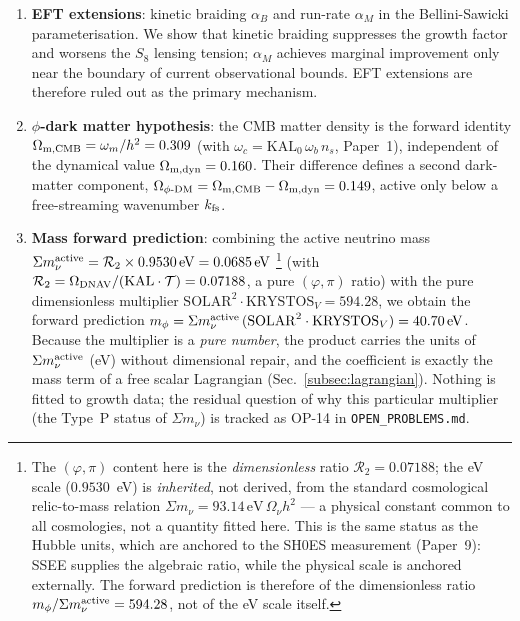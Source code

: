 \documentclass[12pt,a4paper]{article}
\newcommand{\phiDM}{\phi\text{-DM}}
\newcommand{\kfs}{k_{\rm fs}}
\newcommand{\mphi}{m_\phi}
\newcommand{\mnu}{\Sigma m_\nu}
\begin{document}
\begin{enumerate}
  \item \textbf{EFT extensions}: kinetic braiding $\alpha_B$ and run-rate $\alpha_M$
    in the Bellini-Sawicki \citep{Bellini2015} parameterisation.
    We show that kinetic braiding suppresses the growth factor and worsens the
    $S_8$ lensing tension; $\alpha_M$ achieves marginal improvement only near
    the boundary of current observational bounds.  EFT extensions are therefore
    ruled out as the primary mechanism.
  \item \textbf{$\phi$-dark matter hypothesis}: the CMB matter density is the
    forward identity $\Omega_{\rm m,CMB} = \omega_m/h^2 = 0.309$
    (with $\omega_c = \mathrm{KAL}_0\,\omega_b\,n_s$, Paper~1), independent of the
    dynamical value $\Omega_{\rm m,dyn} = 0.160$. Their difference defines a second
    dark-matter component, $\Omega_{\phiDM} = \Omega_{\rm m,CMB} - \Omega_{\rm m,dyn}
    = 0.149$, active only below a free-streaming wavenumber $\kfs$.
  \item \textbf{Mass forward prediction}: combining the active neutrino mass
    $\mnu^{\rm active} = \mathcal{R}_2 \times 0.9530\,\mathrm{eV} = 0.0685\,\mathrm{eV}$%
    \footnote{The $(\varphi,\pi)$ content here is the \emph{dimensionless} ratio
    $\mathcal{R}_2 = 0.07188$; the eV scale ($0.9530$~eV) is \emph{inherited}, not derived,
    from the standard cosmological relic-to-mass relation
    $\Sigma m_\nu = 93.14\,\mathrm{eV}\,\Omega_\nu h^2$ --- a physical constant common to
    all cosmologies, not a quantity fitted here. This is the same status as the Hubble
    units, which are anchored to the SH0ES measurement (Paper~9): SSEE supplies the
    algebraic ratio, while the physical scale is anchored externally. The forward
    prediction is therefore of the dimensionless ratio $\mphi/\mnu^{\rm active}=594.28$,
    not of the eV scale itself.}
    (with $\mathcal{R}_2 = \Omega_{\rm DNAV}/(\mathrm{KAL}\cdot\mathcal{T}) = 0.07188$,
    a pure $(\varphi,\pi)$ ratio) with the pure dimensionless multiplier
    $\mathrm{SOLAR}^2\cdot\mathrm{KRYSTOS}_V = 594.28$, we obtain the
    forward prediction
    $\mphi = \mnu^{\rm active}\,(\mathrm{SOLAR}^2\cdot\mathrm{KRYSTOS}_V)
    = 40.70\,\mathrm{eV}$.  Because the multiplier is a \emph{pure number}, the
    product carries the units of $\mnu^{\rm active}$ (eV) without dimensional
    repair, and the coefficient is exactly the mass term of a free scalar
    Lagrangian (Sec.~\ref{subsec:lagrangian}).  Nothing is fitted to growth data; the
    residual question of why this particular multiplier (the Type~P status of
    $\Sigma m_\nu$) is tracked as OP-14 in \texttt{OPEN\_PROBLEMS.md}.
\end{enumerate}
\end{document}
